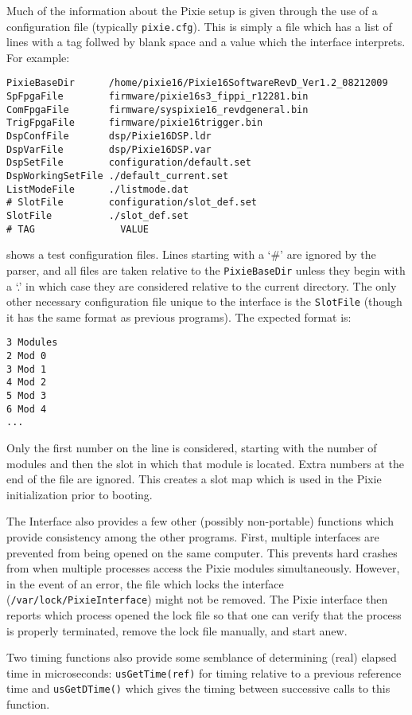 \documentclass{article}
\begin{document}
Much of the information about the Pixie setup is given through the use of a configuration file (typically \texttt{pixie.cfg}). This is simply a file which has a list of lines with a tag follwed by blank space and a value which the interface interprets. For example:
\begin{verbatim}
PixieBaseDir      /home/pixie16/Pixie16SoftwareRevD_Ver1.2_08212009
SpFpgaFile        firmware/pixie16s3_fippi_r12281.bin
ComFpgaFile       firmware/syspixie16_revdgeneral.bin
TrigFpgaFile      firmware/pixie16trigger.bin
DspConfFile       dsp/Pixie16DSP.ldr
DspVarFile        dsp/Pixie16DSP.var
DspSetFile        configuration/default.set
DspWorkingSetFile ./default_current.set
ListModeFile      ./listmode.dat
# SlotFile        configuration/slot_def.set
SlotFile          ./slot_def.set
# TAG               VALUE
\end{verbatim}
shows a test configuration files. Lines starting with a `\#' are ignored by the parser, and all files are taken relative to the \texttt{PixieBaseDir} unless they begin with a `.' in which case they are considered relative to the current directory. The only other necessary configuration file unique to the interface is the \texttt{SlotFile} (though it has the same format as previous programs). The expected format is:
\begin{verbatim}
3 Modules
2 Mod 0 
3 Mod 1
4 Mod 2
5 Mod 3
6 Mod 4
...
\end{verbatim}
Only the first number on the line is considered, starting with the number of modules and then the slot in which that module is located. Extra numbers at the end of the file are ignored. This creates a slot map which is used in the Pixie initialization prior to booting.

The Interface also provides a few other (possibly non-portable) functions which provide consistency among the other programs. First, multiple interfaces are prevented from being opened on the same computer. This prevents hard crashes from when multiple processes access the Pixie modules simultaneously. However, in the event of an error, the file which locks the interface (\texttt{/var/lock/PixieInterface}) might not be removed. The Pixie interface then reports which process opened the lock file so that one can verify that the process is properly terminated, remove the lock file manually, and start anew.

Two timing functions also provide some semblance of determining (real) elapsed time in microseconds: \texttt{usGetTime(ref)} for timing relative to a previous reference time and \texttt{usGetDTime()} which gives the timing between successive calls to this function.
 
\end{document}
